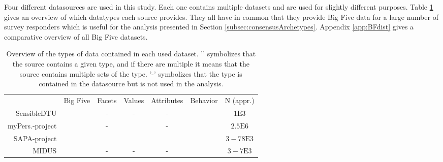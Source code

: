 Four different datasources are used in this study. Each one contains multiple datasets and are used for slightly different purposes. Table \ref{tab:dataSourceOverview} gives an overview of which datatypes each source provides. They all have in common that they provide Big Five data for a large number of survey responders which is useful for the analysis presented in Section \ref{subsec:consensusArchetypes}. Appendix \ref{app:BFdist} gives a comparative overview of all Big Five datasets.

\newcommand{\OK}{\ding{51}}%
\begin{table}[!ht]
	\centering
	\begin{tabular}{r|ccccc|c}
	{}				& Big Five	& Facets	& Values	& Attributes	& Behavior 	& 	N (appr.)	\\ \cline{1-7}
	SensibleDTU		& \OK		& -			& -			& -				& \OK		& 	$1\mathrm{E}3$		\\
	myPers.-project	& \OK		& -			& \OK		& -				& 			& 	$2.5\mathrm{E}6$		\\
	SAPA-project	& \OK\OK\OK	& \OK		& 			& \OK			& 			& 	$3-78\mathrm{E}3$		\\
	MIDUS			& \OK\OK\OK	& -			& -			& -				& 			& 	$3-7\mathrm{E}3$
	\end{tabular}
	\caption{\label{tab:dataSourceOverview} Overview of the types of data contained in each used dataset. '\OK' symbolizes that the source contains a given type, and if there are multiple it means that the source contains multiple sets of the type. '-' symbolizes that the type is contained in the datasource but is not used in the analysis.}
\end{table}